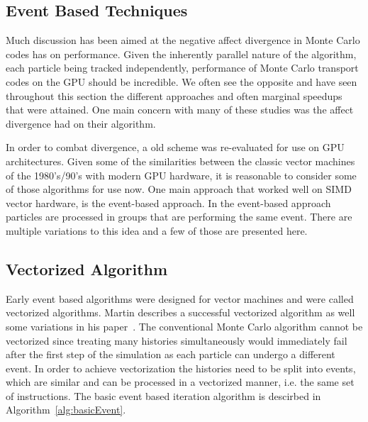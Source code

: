 \subsection{Event Based Techniques}

Much discussion has been aimed at the negative affect divergence in Monte Carlo codes has on  performance.
%
Given the inherently parallel nature of the algorithm, each particle being tracked independently, performance of Monte Carlo transport codes on the GPU should be incredible.
%
We often see the opposite and have seen throughout this section the different approaches and often marginal speedups that were attained.
%
One main concern with many of these studies was the affect divergence had on their algorithm.
%

%
In order to combat divergence, a old scheme was re-evaluated for use on GPU architectures.
%
Given some of the similarities between the classic vector machines of the 1980's/90's with modern GPU hardware, it is reasonable to consider some of those algorithms for use now.
%
One main approach that worked well on SIMD vector hardware, is the event-based approach.
%
In the event-based approach particles are processed in groups that are performing the same event.
%
There are multiple variations to this idea and a few of those are presented here.
%

\subsection*{Vectorized Algorithm}

%
Early event based algorithms were designed for vector machines and were called vectorized algorithms.
%
Martin describes a successful vectorized algorithm as well some variations in his paper~\cite{martin1989successful}.
%
The conventional Monte Carlo algorithm cannot be vectorized since treating many histories simultaneously would immediately fail after the first step of the simulation as each particle can undergo a different event.
%
In order to achieve vectorization the histories need to be split into events, which are similar and can be processed in a vectorized manner, i.e. the same set of instructions.
%
The basic event based iteration algorithm is descirbed in Algorithm~\ref{alg:basicEvent}.
%

